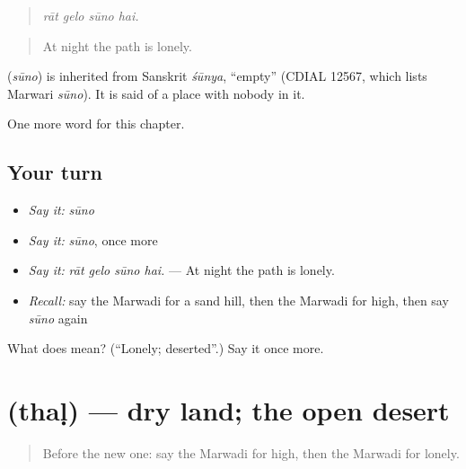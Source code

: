\begin{quote}
   
\end{quote}

\begin{quote}
\emph{rāt gelo sūno hai.}
\end{quote}

\begin{quote}
At night the path is lonely.
\end{quote}

\begin{cousinweb}
\textbf{} (\emph{sūno}) is inherited from Sanskrit \emph{śūnya}, \textquotedblleft{}empty\textquotedblright{} (CDIAL 12567, which lists Marwari \emph{sūno}). It is said of a place with nobody in it.
\end{cousinweb}

\begin{grammarlens}[title={What you've built}]
One more word for this chapter.
\end{grammarlens}

\subsection*{Your turn}
\begin{itemize}
\raggedright
  \item \emph{Say it:} \emph{sūno}
  \item \emph{Say it:} \emph{sūno}, once more
  \item \emph{Say it:} \emph{rāt gelo sūno hai.} — At night the path is lonely.
  \item \emph{Recall:} say the Marwadi for a sand hill, then the Marwadi for high, then say \emph{sūno} again
\end{itemize}

\begin{tcolorbox}[breakable,colback=teal!4,colframe=teal!35!black,title={Before you move on}]
What does  mean? (\textquotedblleft{}Lonely; deserted\textquotedblright{}.) Say it once more.
\end{tcolorbox}
\section[\texorpdfstring{\mw{थळ} (thaḷ)}{थळ (thaḷ)}]{ (thaḷ) — dry land; the open desert}

\label{lesson:MW-C226-thal}



\begin{quote}
Before the new one: say the Marwadi for high, then the Marwadi for lonely.
\end{quote}

